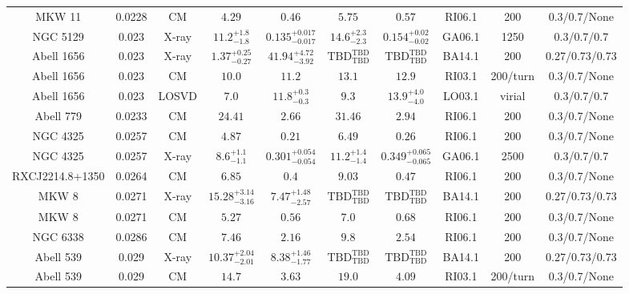\begin{table}
\begin{tabular}{cccccccccc}
MKW 11 & 0.0228 & CM & ${4.29}^{}_{}$ & ${0.46}^{}_{}$ & ${5.75}^{}_{}$ & ${0.57}^{}_{}$ & RI06.1 & 200 & 0.3/0.7/None \\
NGC 5129 & 0.023 & X-ray & ${11.2}^{+1.8}_{-1.8}$ & ${0.135}^{+0.017}_{-0.017}$ & ${14.6}^{+2.3}_{-2.3}$ & ${0.154}^{+0.02}_{-0.02}$ & GA06.1 & 1250 & 0.3/0.7/0.7 \\
Abell 1656 & 0.023 & X-ray & ${1.37}^{+0.25}_{-0.27}$ & ${41.94}^{+4.72}_{-3.92}$ & ${\mathrm{TBD}}^{\mathrm{TBD}}_{\mathrm{TBD}}$ & ${\mathrm{TBD}}^{\mathrm{TBD}}_{\mathrm{TBD}}$ & BA14.1 & 200 & 0.27/0.73/0.73 \\
Abell 1656 & 0.023 & CM & ${10.0}^{}_{}$ & ${11.2}^{}_{}$ & ${13.1}^{}_{}$ & ${12.9}^{}_{}$ & RI03.1 & 200/turn & 0.3/0.7/None \\
Abell 1656 & 0.023 & LOSVD & ${7.0}^{}_{}$ & ${11.8}^{+0.3}_{-0.3}$ & ${9.3}^{}_{}$ & ${13.9}^{+4.0}_{-4.0}$ & LO03.1 & virial & 0.3/0.7/0.7 \\
Abell 779 & 0.0233 & CM & ${24.41}^{}_{}$ & ${2.66}^{}_{}$ & ${31.46}^{}_{}$ & ${2.94}^{}_{}$ & RI06.1 & 200 & 0.3/0.7/None \\
NGC 4325 & 0.0257 & CM & ${4.87}^{}_{}$ & ${0.21}^{}_{}$ & ${6.49}^{}_{}$ & ${0.26}^{}_{}$ & RI06.1 & 200 & 0.3/0.7/None \\
NGC 4325 & 0.0257 & X-ray & ${8.6}^{+1.1}_{-1.1}$ & ${0.301}^{+0.054}_{-0.054}$ & ${11.2}^{+1.4}_{-1.4}$ & ${0.349}^{+0.065}_{-0.065}$ & GA06.1 & 2500 & 0.3/0.7/0.7 \\
RXCJ2214.8+1350 & 0.0264 & CM & ${6.85}^{}_{}$ & ${0.4}^{}_{}$ & ${9.03}^{}_{}$ & ${0.47}^{}_{}$ & RI06.1 & 200 & 0.3/0.7/None \\
MKW 8 & 0.0271 & X-ray & ${15.28}^{+3.14}_{-3.16}$ & ${7.47}^{+1.48}_{-2.57}$ & ${\mathrm{TBD}}^{\mathrm{TBD}}_{\mathrm{TBD}}$ & ${\mathrm{TBD}}^{\mathrm{TBD}}_{\mathrm{TBD}}$ & BA14.1 & 200 & 0.27/0.73/0.73 \\
MKW 8 & 0.0271 & CM & ${5.27}^{}_{}$ & ${0.56}^{}_{}$ & ${7.0}^{}_{}$ & ${0.68}^{}_{}$ & RI06.1 & 200 & 0.3/0.7/None \\
NGC 6338 & 0.0286 & CM & ${7.46}^{}_{}$ & ${2.16}^{}_{}$ & ${9.8}^{}_{}$ & ${2.54}^{}_{}$ & RI06.1 & 200 & 0.3/0.7/None \\
Abell 539 & 0.029 & X-ray & ${10.37}^{+2.04}_{-2.01}$ & ${8.38}^{+1.46}_{-1.77}$ & ${\mathrm{TBD}}^{\mathrm{TBD}}_{\mathrm{TBD}}$ & ${\mathrm{TBD}}^{\mathrm{TBD}}_{\mathrm{TBD}}$ & BA14.1 & 200 & 0.27/0.73/0.73 \\
Abell 539 & 0.029 & CM & ${14.7}^{}_{}$ & ${3.63}^{}_{}$ & ${19.0}^{}_{}$ & ${4.09}^{}_{}$ & RI03.1 & 200/turn & 0.3/0.7/None \\

\end{tabular}
\end{table}
